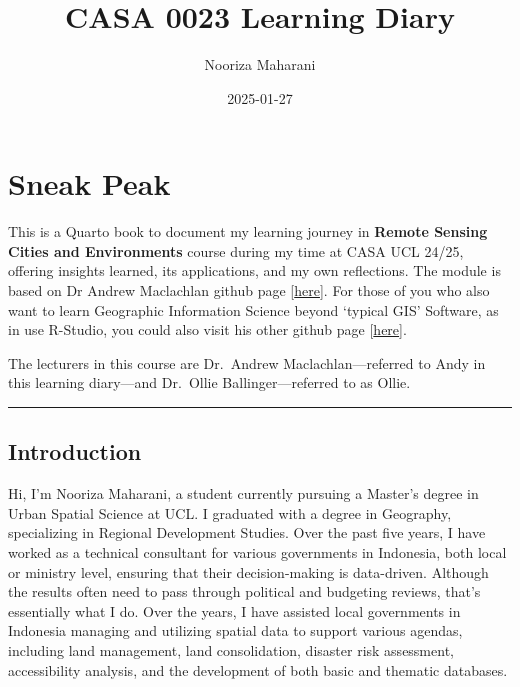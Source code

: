 \documentclass[
  letterpaper,
  DIV=11,
  numbers=noendperiod]{scrreprt}
\title{CASA 0023 Learning Diary}
\author{Nooriza Maharani}
\date{2025-01-27}
\renewcommand*\contentsname{Table of contents}
\newcommand\contentsname{Table of contents}
\begin{document}
\maketitle
\ifdefined\Shaded\renewenvironment{Shaded}{\begin{tcolorbox}[enhanced, sharp corners, frame hidden, borderline west={3pt}{0pt}{shadecolor}, breakable, interior hidden, boxrule=0pt]}{\end{tcolorbox}}\fi

\renewcommand*\contentsname{Table of contents}
{
\hypersetup{linkcolor=}
\setcounter{tocdepth}{2}
\tableofcontents
}

\hypertarget{sneak-peak}{%
\chapter{Sneak Peak}\label{sneak-peak}}

This is a Quarto book to document my learning journey in \textbf{Remote
Sensing Cities and Environments} course during my time at CASA UCL
24/25, offering insights learned, its applications, and my own
reflections. The module is based on Dr Andrew Maclachlan github page
{[}\href{https://andrewmaclachlan.github.io/CASA0023/.}{here}{]}. For
those of you who also want to learn Geographic Information Science
beyond `typical GIS' Software, as in use R-Studio, you could also visit
his other github page
{[}\href{https://andrewmaclachlan.github.io/CASA0005repo/index.html}{here}{]}.

The lecturers in this course are Dr.~Andrew Maclachlan---referred to
Andy in this learning diary---and Dr.~Ollie Ballinger---referred to as
Ollie.

\begin{center}\rule{0.5\linewidth}{0.5pt}\end{center}

\hypertarget{introduction}{%
\section{Introduction}\label{introduction}}

Hi, I'm Nooriza Maharani, a student currently pursuing a Master's degree
in Urban Spatial Science at UCL. I graduated with a degree in Geography,
specializing in Regional Development Studies. Over the past five years,
I have worked as a technical consultant for various governments in
Indonesia, both local or ministry level, ensuring that their
decision-making is data-driven. Although the results often need to pass
through political and budgeting reviews, that's essentially what I do.
Over the years, I have assisted local governments in Indonesia managing
and utilizing spatial data to support various agendas, including land
management, land consolidation, disaster risk assessment, accessibility
analysis, and the development of both basic and thematic databases.
\end{document}
